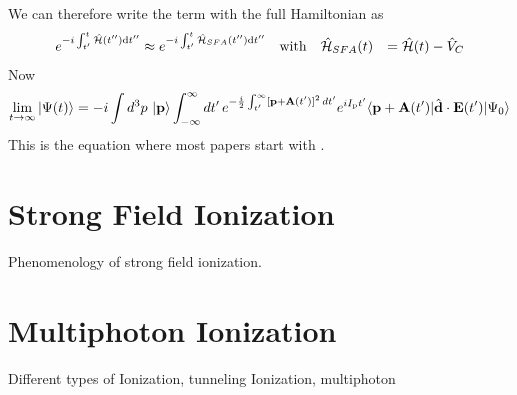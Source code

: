 We can therefore write the term with the full Hamiltonian as
\begin{equation*}
    \begin{aligned}
        e^{-i \int_{t'}^{t} \hat{\mathcal{H}}(t'') \mathrm{d} t''} &\approx e^{-i \int_{t'}^{t} \hat{\mathcal{H}}_{SFA}(t'') \mathrm{d} t''} \quad \text{with} \quad \hat{\mathcal{H}}_{SFA}(t) &= \hat{\mathcal{H}}(t) - \hat{V}_C
    \end{aligned}
\end{equation*}
Now
\begin{equation}
    \lim_{t \to \infty} \ket{\Psi(t)}  = -i \int d^3 p\, \ket{\mathbf{p}} \int_{-\infty}^{\infty} dt'\, e^{-\frac{i}{2}\int_{t'}^{\infty} [\mathbf{p}+\mathbf{A}(t')]^2 \, dt'} e^{i I_\mathrm{p} t'} \langle \mathbf{p} + \mathbf{A}(t') | \hat{\mathbf{d}} \cdot \mathbf{E}(t') | \Psi_0 \rangle
\end{equation}
This is the equation where most papers start with \cite{Theory_NPS}.











\newpage
\section{Strong Field Ionization}

Phenomenology of strong field ionization.










\newpage
\section{Multiphoton Ionization}

Different types of Ionization, tunneling Ionization, multiphoton
